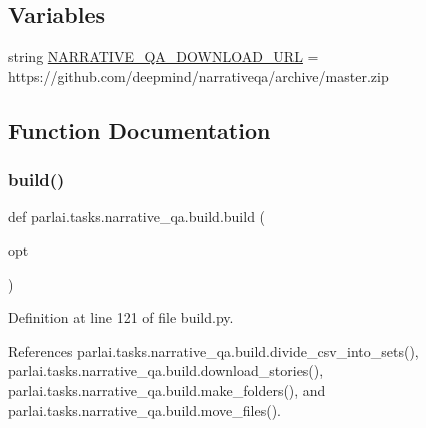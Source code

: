 \subsection*{Variables}
\begin{DoxyCompactItemize}
\item 
string \hyperlink{namespaceparlai_1_1tasks_1_1narrative__qa_1_1build_a7bc36495d22dbc4c30bd47d2e7bdab84}{N\+A\+R\+R\+A\+T\+I\+V\+E\+\_\+\+Q\+A\+\_\+\+D\+O\+W\+N\+L\+O\+A\+D\+\_\+\+U\+RL} = \textquotesingle{}https\+://github.\+com/deepmind/narrativeqa/archive/master.\+zip\textquotesingle{}
\end{DoxyCompactItemize}


\subsection{Function Documentation}
\mbox{\label{namespaceparlai_1_1tasks_1_1narrative__qa_1_1build_a51a4aace1ca9f9cbdc332405edaf1ef5}} 
\subsubsection{\texorpdfstring{build()}{build()}}
{\footnotesize\ttfamily def parlai.\+tasks.\+narrative\+\_\+qa.\+build.\+build (\begin{DoxyParamCaption}\item[{}]{opt }\end{DoxyParamCaption})}



Definition at line 121 of file build.\+py.



References parlai.\+tasks.\+narrative\+\_\+qa.\+build.\+divide\+\_\+csv\+\_\+into\+\_\+sets(), parlai.\+tasks.\+narrative\+\_\+qa.\+build.\+download\+\_\+stories(), parlai.\+tasks.\+narrative\+\_\+qa.\+build.\+make\+\_\+folders(), and parlai.\+tasks.\+narrative\+\_\+qa.\+build.\+move\+\_\+files().

